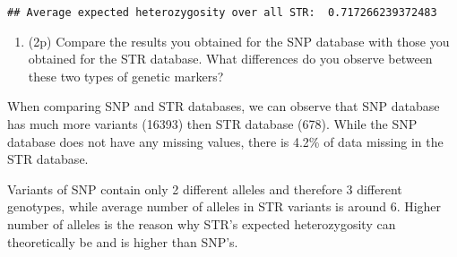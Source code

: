 \documentclass[
]{article}
\providecommand{\tightlist}{%
  \setlength{\itemsep}{0pt}\setlength{\parskip}{0pt}}
\begin{document}
\begin{verbatim}
## Average expected heterozygosity over all STR:  0.717266239372483
\end{verbatim}

\begin{enumerate}
\def\labelenumi{\arabic{enumi}.}
\setcounter{enumi}{6}
\tightlist
\item
  (2p) Compare the results you obtained for the SNP database with those
  you obtained for the STR database. What differences do you observe
  between these two types of genetic markers?
\end{enumerate}

When comparing SNP and STR databases, we can observe that SNP database
has much more variants (16393) then STR database (678). While the SNP
database does not have any missing values, there is 4.2\% of data
missing in the STR database.

Variants of SNP contain only 2 different alleles and therefore 3
different genotypes, while average number of alleles in STR variants is
around 6. Higher number of alleles is the reason why STR's expected
heterozygosity can theoretically be and is higher than SNP's.
\end{document}
